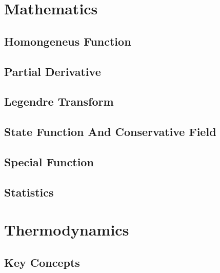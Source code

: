 \documentclass[10pt]{report}
\begin{document}
\pagestyle{empty}

\nocite{*}
\clearpage
\tableofcontents
\clearpage

\chapter{Mathematics}
\clearpage

\section{Homongeneus Function}
\clearpage

\section{Partial Derivative}
\clearpage

\section{Legendre Transform}
\clearpage

\section{State Function And Conservative Field}
\clearpage

\section{Special Function}
\clearpage 

\section{Statistics}


\chapter{Thermodynamics}\clearpage

\section{Key Concepts}
\clearpage
\end{document}
